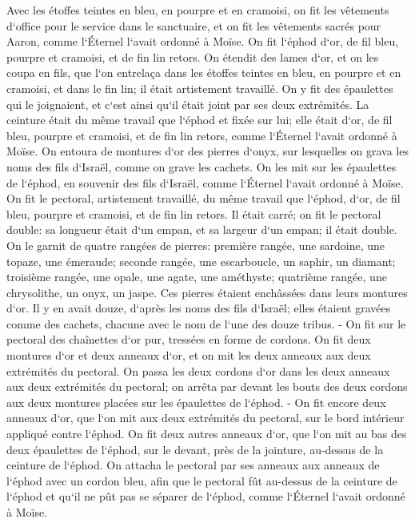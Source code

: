 \verse Avec les étoffes teintes en bleu, en pourpre et en cramoisi, on fit les vêtements d`office pour le service dans le sanctuaire, et on fit les vêtements sacrés pour Aaron, comme l`Éternel l`avait ordonné à Moïse. 
\verse On fit l`éphod d`or, de fil bleu, pourpre et cramoisi, et de fin lin retors. 
\verse On étendit des lames d`or, et on les coupa en fils, que l`on entrelaça dans les étoffes teintes en bleu, en pourpre et en cramoisi, et dans le fin lin; il était artistement travaillé. 
\verse On y fit des épaulettes qui le joignaient, et c`est ainsi qu`il était joint par ses deux extrémités. 
\verse La ceinture était du même travail que l`éphod et fixée sur lui; elle était d`or, de fil bleu, pourpre et cramoisi, et de fin lin retors, comme l`Éternel l`avait ordonné à Moïse. 
\verse On entoura de montures d`or des pierres d`onyx, sur lesquelles on grava les noms des fils d`Israël, comme on grave les cachets. 
\verse On les mit sur les épaulettes de l`éphod, en souvenir des fils d`Israël, comme l`Éternel l`avait ordonné à Moïse. 
\verse On fit le pectoral, artistement travaillé, du même travail que l`éphod, d`or, de fil bleu, pourpre et cramoisi, et de fin lin retors. 
\verse Il était carré; on fit le pectoral double: sa longueur était d`un empan, et sa largeur d`un empan; il était double. 
\verse On le garnit de quatre rangées de pierres: première rangée, une sardoine, une topaze, une émeraude; 
\verse seconde rangée, une escarboucle, un saphir, un diamant; 
\verse troisième rangée, une opale, une agate, une améthyste; 
\verse quatrième rangée, une chrysolithe, un onyx, un jaspe. Ces pierres étaient enchâssées dans leurs montures d`or. 
\verse Il y en avait douze, d`après les noms des fils d`Israël; elles étaient gravées comme des cachets, chacune avec le nom de l`une des douze tribus. - 
\verse On fit sur le pectoral des chaînettes d`or pur, tressées en forme de cordons. 
\verse On fit deux montures d`or et deux anneaux d`or, et on mit les deux anneaux aux deux extrémités du pectoral. 
\verse On passa les deux cordons d`or dans les deux anneaux aux deux extrémités du pectoral; 
\verse on arrêta par devant les bouts des deux cordons aux deux montures placées sur les épaulettes de l`éphod. - 
\verse On fit encore deux anneaux d`or, que l`on mit aux deux extrémités du pectoral, sur le bord intérieur appliqué contre l`éphod. 
\verse On fit deux autres anneaux d`or, que l`on mit au bas des deux épaulettes de l`éphod, sur le devant, près de la jointure, au-dessus de la ceinture de l`éphod. 
\verse On attacha le pectoral par ses anneaux aux anneaux de l`éphod avec un cordon bleu, afin que le pectoral fût au-dessus de la ceinture de l`éphod et qu`il ne pût pas se séparer de l`éphod, comme l`Éternel l`avait ordonné à Moïse. 
